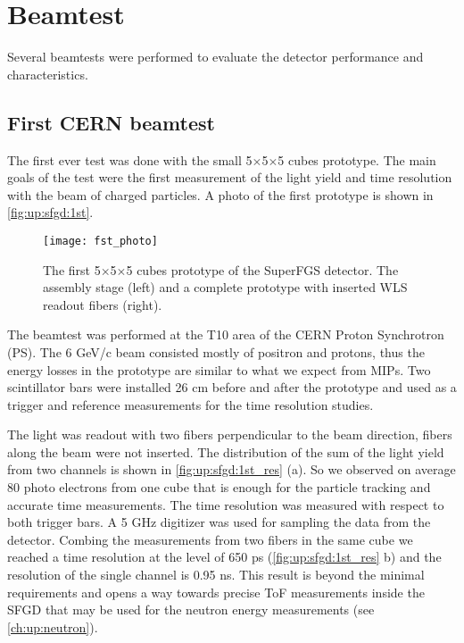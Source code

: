 \documentclass[main.tex]{subfiles}
\begin{document}
\section{Beamtest}
\label{sec:up:sfgd:beam}
Several beamtests were performed to evaluate the detector performance and characteristics.

\subsection{First CERN beamtest}
\label{sec:up:sfgd:beam1}
The first ever test was done with the small 5$\times$5$\times$5 cubes prototype. The main goals of the test were the first measurement of the light yield and time resolution with the beam of charged particles. A photo of the first prototype is shown in \autoref{fig:up:sfgd:1st}.

\begin{figure}[!ht]
	\centering
	\texttt{[image: fst\_photo]}
	\caption{The first 5$\times$5$\times$5 cubes prototype of the SuperFGS detector. The assembly stage (left) and a complete prototype with inserted WLS readout fibers (right).}
	\label{fig:up:sfgd:1st}
\end{figure}

The beamtest was performed at the T10 area of the CERN Proton Synchrotron (PS). The 6 GeV/c beam consisted mostly of positron and protons, thus the energy losses in the prototype are similar to what we expect from MIPs. Two scintillator bars were installed 26 cm before and after the prototype and used as a trigger and reference measurements for the time resolution studies.

The light was readout with two fibers perpendicular to the beam direction, fibers along the beam were not inserted. The distribution of the sum of the light yield from two channels is shown in \autoref{fig:up:sfgd:1st_res} (a). So we observed on average 80 photo electrons from one cube that is enough for the particle tracking and accurate time measurements. The time resolution was measured with respect to both trigger bars. A 5 GHz digitizer was used for sampling the data from the detector. Combing the measurements from two fibers in the same cube we reached a time resolution at the level of 650 ps (\autoref{fig:up:sfgd:1st_res} b) and the resolution of the single channel is 0.95 ns. This result is beyond the minimal requirements and opens a way towards precise ToF measurements inside the SFGD that may be used for the neutron energy measurements (see \autoref{ch:up:neutron}).
\end{document}
